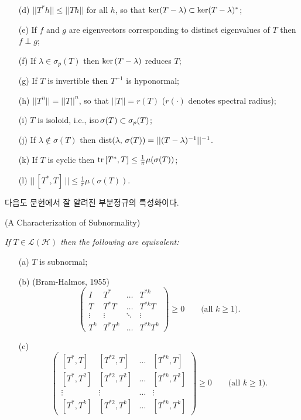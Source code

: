 \documentclass[12pt,a4paper,2sided]{article}
\newcommand{\vs}{\vspace}
\begin{document}
\newpage
{}

 \vspace{0.4cm}

{\sl \begin{itemize} \item[\rm(d)] $||T^*h||\le ||Th||$ for all $h$,
so that $\text{\rm ker}(T-\lambda)\subset \text{\rm
ker}(T-\lambda)^*$;
\item[\rm(e)] If $f$ and $g$ are eigenvectors corresponding to
distinct eigenvalues of $T$ then $f\perp g$; \item[\rm(f)] If
$\lambda\in\sigma_p(T)$ then $\text{\rm ker}\,(T-\lambda)$ reduces
$T$; \item[\rm(g)] If $T$ is invertible then $T^{-1}$ is hyponormal;
\item[\rm(h)]  $||T^n||=||T||^n$, so that
$||T||=r(T)$ {\rm (}$r(\cdot)$ denotes spectral radius{\rm )};
\item[\rm(i)] $T$ is isoloid, i.e., $\text{\rm
iso}\,\sigma(T)\subset \sigma_p(T)$; \item[\rm(j)] If $\lambda\notin
\sigma(T)$ then $\text{\rm dist}(\lambda,\,
\sigma(T))=||(T-\lambda)^{-1}||^{-1}$. \item[\rm(k)]  If $T$ is cyclic then $\text{\rm
tr}\,[T^*,T]\le\frac{1}{\pi}\mu(\sigma(T))$; \item[\rm(l)]  $||\,[T^*,T]\,||\le\frac{1}{\pi}
\mu(\sigma(T))$.
\end{itemize} }



다음도 문헌에서 잘 알려진 부분정규의 특성화이다.

\vs{0.3cm}{\bf Proposition 2.0.2.} {\rm (A Characterization of
Subnormality) \cite{Con2}}\label{thm3.5} {\sl If
$T\in\mathcal{L(H)}$ then the following are equivalent:
\begin{itemize}
\item[\rm(a)] $T$ is subnormal;
\item[\rm(b)] {\rm (Bram-Halmos, 1955)}
$$
\begin{pmatrix}
I&T^*&\hdots& T^{*k}\\
T& T^*T& \hdots& T^{*k}T\\
\vdots&\vdots& \ddots& \vdots\\
T^k& T^*T^k& \hdots& T ^{*k}T^k
\end{pmatrix}
\ge 0\qquad\text{(all $k\ge 1$)}.
$$
\item[\rm(c)]
$$
\begin{pmatrix}
[T^*,T]&[T^{*2},T]&\hdots&[T^{*k},T]\\
[T^*,T^2]&[T^{*2},T^2]&\hdots&[T^{*k},T^2]\\
\vdots&\vdots&\hdots&\vdots\\
[T^*,T^k]&[T^{*2},T^k]&\hdots&[T^{*k},T^k]
\end{pmatrix}
\ge 0\qquad\text{(all $k\ge 1$)}.
$$  \end{itemize}}
\end{document}
